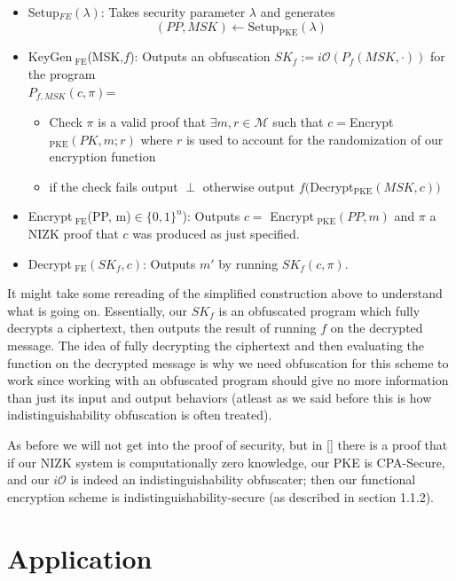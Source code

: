 \documentclass[12pt,twoside]{reedthesis}
\begin{document}
    \begin{itemize}
    \item Setup$_{ FE}(\lambda)$: Takes security parameter $\lambda$ and generates
     $$(PP, MSK) \leftarrow \text{Setup}_{\text{PKE}}(\lambda)$$
     \item KeyGen$_\text{ FE}$(MSK,$f$): Outputs an obfuscation $SK_f := i\mathcal{O}(P_f(MSK, \cdot))$ for the program 
     \\ $P_{f,MSK}(c,\pi)$=
     \begin{itemize}
     \item Check $\pi$ is a valid proof that $\exists m,r \in \mathcal{M}$ such that $c =$Encrypt$_\text{PKE}(PK,m;r)$ where $r$ is used to account for the randomization of our encryption function
     \item if the check fails output $\perp$ otherwise output $f($Decrypt$_\text{PKE}(MSK,c))$
     \end{itemize}
     \item Encrypt$_\text{ FE}$(PP, m)$\in \{ 0,1 \}^n$): Outputs $c =$ Encrypt$_\text{ PKE}(PP, m)$ and $\pi$ a NIZK proof that $c$ was produced as just specified.
     \item Decrypt$_\text{ FE}(SK_f,c)$: Outputs $m'$ by running $SK_f(c,\pi)$.

    
    \end{itemize}
    \par It might take some rereading of the simplified construction above to understand what is going on. Essentially, our $SK_f$ is an obfuscated program which fully decrypts a ciphertext, then outputs the result of running $f$ on the decrypted message. The idea of fully decrypting the ciphertext and then evaluating the function on the decrypted message is why we need obfuscation for this scheme to work since working with an obfuscated program should give no more information than just its input and output behaviors (atleast as we said before this is how indistinguishability obfuscation is often treated). 
    \par As before we will not get into the proof of security, but in [\cite{Garg:2013}] there is a proof that if our NIZK system is computationally zero knowledge, our PKE is CPA-Secure, and our $i\mathcal{O}$ is indeed an indistinguishability obfuscater; then our functional encryption scheme is indistinguishability-secure (as described in section 1.1.2).
    
    
    \section{Application}
    
\end{document}

